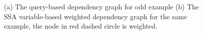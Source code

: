 \begin{figure}
\begin{subfigure}{0.5\textwidth}
\begin{centering}
                                        \end{centering}
                                        \end{subfigure}
                                        \vspace{-0.3cm}
                                        \caption{(a) The query-based dependency graph for odd example (b) The SSA variable-based weighted dependency graph for the same example, the node in red dashed circle is weighted.}
                                        \label{fig:odd_graphs}
                                        \vspace{-0.3cm}
                                    \end{figure}